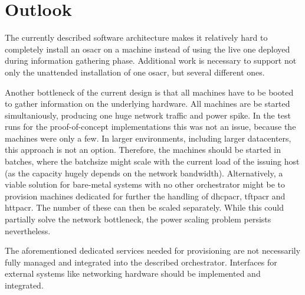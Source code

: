 \chapter{Outlook}





The currently described software architecture makes it relatively hard to completely install an \gls{osacr} on a machine instead of using the live one deployed during information gathering phase. Additional work is necessary to support not only the unattended installation of one \gls{osacr}, but several different ones.

Another bottleneck of the current design is that all machines have to be booted to gather information on the underlying hardware. All machines are be started simultaniously, producing one huge network traffic and power spike. In the test runs for the proof-of-concept implementations this was not an issue, because the machines were only a few. In larger environments, including larger datacenters, this approach is not an option. Therefore, the machines should be started in batches, where the batchsize might scale with the current load of the issuing host (as the capacity hugely depends on the network bandwidth). Alternatively, a viable solution for bare-metal systems with no other orchestrator might be to provision machines dedicated for further the handling of \gls{dhcpacr}, \gls{tftpacr} and \gls{httpacr}. The number of these can then be scaled separately. While this could partially solve the network bottleneck, the power scaling problem persists nevertheless.

The aforementioned dedicated services needed for provisioning are not necessarily fully managed and integrated into the described orchestrator. Interfaces for external systems like networking hardware should be implemented and integrated.

